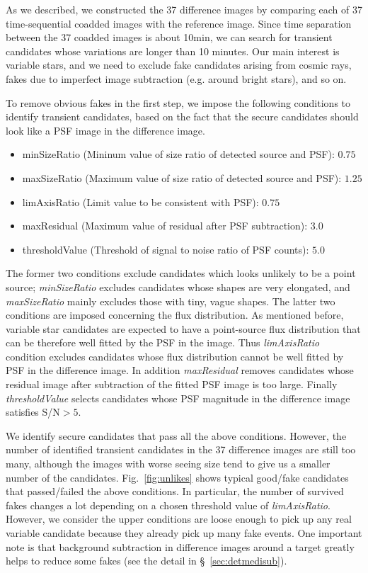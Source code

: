 \documentclass[iop, apj]{emulateapj}
\newcommand{\?}{\stackrel{?}{=}}
\begin{document}
As we described, we constructed the 37 difference images by comparing each of 37 time-sequential coadded images with the reference image. Since time separation between the 37 coadded images is about 10min, we can search for transient candidates whose variations are longer than 10 minutes. Our main interest is variable stars, and we need to exclude fake candidates arising from cosmic rays, fakes due to imperfect image subtraction (e.g. around bright stars), and so on. 

To remove obvious fakes in the first step, we impose the following conditions to identify transient candidates, based on the fact that the secure candidates should look like a PSF image in the difference image. 
%
\begin{itemize}
\item{minSizeRatio (Mininum value of size ratio of detected source and PSF): $0.75$}
\item{maxSizeRatio (Maximum value of size ratio of detected source and PSF): $1.25$}
\item{limAxisRatio (Limit value to be consistent with PSF): $0.75$}
\item{maxResidual (Maximum value of residual after PSF subtraction): $3.0$}
\item{thresholdValue (Threshold of signal to noise ratio of PSF counts): $5.0$}
\end{itemize}
%
The former two conditions exclude candidates which looks unlikely to be a point source; {\it minSizeRatio} excludes candidates whose shapes are very elongated, and {\it maxSizeRatio} mainly excludes those with tiny, vague shapes. The latter two conditions are imposed concerning the flux distribution. As mentioned before, variable star candidates are expected to have a point-source flux distribution that can be therefore well fitted by the PSF in the image. Thus {\it limAxisRatio} condition excludes candidates whose flux distribution cannot be well fitted by PSF in the difference image. In addition {\it maxResidual} removes candidates whose residual image after subtraction of the fitted PSF image is too large. Finally {\it thresholdValue} selects candidates whose PSF magnitude in the difference image satisfies S/N$>5$. 

We identify secure candidates that pass all the above conditions. However, the number of identified transient candidates in the 37 difference images are still too many, although the images with worse seeing size tend to give us a smaller number of the candidates. 
Fig.~\ref{fig:unlikes} shows typical good/fake candidates that passed/failed the above conditions. In particular, the number of survived fakes changes a lot depending on a chosen threshold value of {\it limAxisRatio}. However, we consider the upper conditions are loose enough to pick up any real variable candidate because they already pick up many fake events. One important note is that 
background subtraction in difference images %
around a target greatly helps to reduce some fakes (see the detail in \S~\ref{sec:detmedisub}). 
\end{document}

